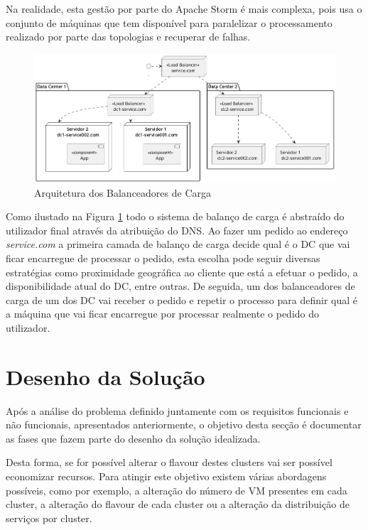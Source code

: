Na realidade, esta gestão por parte do Apache Storm é mais complexa, pois usa o conjunto de
máquinas que tem disponível para paralelizar o processamento realizado por parte das topologias e
recuperar de falhas.

\begin{figure}[H]
  \centerline{\includegraphics[scale=0.5]{media/content/analise/lb.png}}
  \caption{Arquitetura dos Balanceadores de Carga}
  \label{lb}
\end{figure}

Como ilustado na Figura \ref{lb} todo o sistema de balanço de carga é abstraído do utilizador
final através da atribuição do DNS. Ao fazer um pedido ao endereço \textit{service.com} a primeira
camada de balanço de carga decide qual é o \ac{DC} que vai ficar encarregue de processar o pedido,
esta escolha pode seguir diversas estratégias como proximidade geográfica ao cliente que está a 
efetuar o pedido, a disponibilidade atual do \ac{DC}, entre outras. De seguida, um dos 
balanceadores de carga de um dos \ac{DC} vai receber o pedido e repetir o processo para definir
qual é a máquina que vai ficar encarregue por processar realmente o pedido do utilizador.

\section{Desenho da Solução}

Após a análise do problema definido juntamente com os requisitos funcionais e não funcionais,
apresentados anteriormente, o objetivo desta secção é documentar as fases que fazem parte do
desenho da solução idealizada.

Desta forma, se for possível alterar o \gls{flavour} destes \glspl{cluster} vai ser possível economizar
recursos. Para atingir este objetivo existem várias abordagens possíveis, como por exemplo, a
alteração do número de \ac{VM} presentes em cada \gls{cluster}, a alteração do \gls{flavour}
de cada \gls{cluster} ou a alteração da distribuição de serviços por \gls{cluster}.


